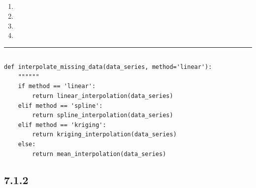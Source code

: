 \hypertarget{section-44}{%
\subsection{}\label{section-44}}

\hypertarget{section-45}{%
\subsection{}\label{section-45}}

\begin{enumerate}
\def\labelenumi{\arabic{enumi}.}
\item
  \important{}
\item
  \important{}
\item
  \important{}
\item
  \important{}
\end{enumerate}

\begin{center}\rule{0.5\linewidth}{0.5pt}\end{center}

\hypertarget{section-46}{%
\subsection{}\label{section-46}}

\hypertarget{section-47}{%
\paragraph{}\label{section-47}}

\begin{lstlisting}[style=python]
def interpolate_missing_data(data_series, method='linear'):
    """"""
    if method == 'linear':
        return linear_interpolation(data_series)
    elif method == 'spline':
        return spline_interpolation(data_series)
    elif method == 'kriging':
        return kriging_interpolation(data_series)
    else:
        return mean_interpolation(data_series)
\end{lstlisting}

\hypertarget{section-48}{%
\subsection{7.1.2}\label{section-48}}

\hypertarget{section-49}{%
\subsubsection{}\label{section-49}}

